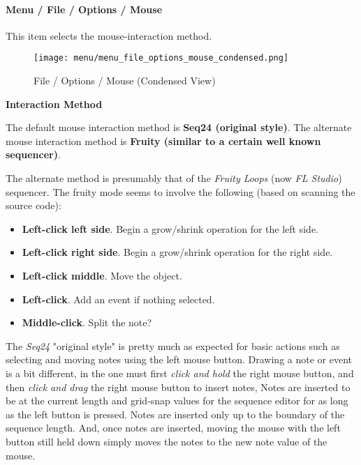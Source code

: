 \paragraph{Menu / File / Options / Mouse }
\label{paragraph:seq64_menu_file_options_mouse}

   This item selects the mouse-interaction method.

\begin{figure}[H]
   \centering 
   \texttt{[image: menu/menu\_file\_options\_mouse\_condensed.png]}
   \caption{File / Options / Mouse (Condensed View)}
   \label{fig:seq64_menu_file_options_mouse}
\end{figure}

   \textbf{Interaction Method}

   The default mouse interaction method is \textbf{Seq24 (original style)}.
   The alternate mouse interaction method is \textbf{Fruity (similar to a
   certain well known sequencer)}.

   The alternate method is presumably that of the \textsl{Fruity Loops}
   (now \textsl{FL Studio}) sequencer.  The fruity mode seems to involve the
   following (based on scanning the source code):

   \begin{itemize}
      \item \textbf{Left-click left side}.
         Begin a grow/shrink operation for the left side.
      \item \textbf{Left-click right side}.
         Begin a grow/shrink operation for the right side.
      \item \textbf{Left-click middle}.
         Move the object.
      \item \textbf{Left-click}.
         Add an event if nothing selected.
      \item \textbf{Middle-click}.
         Split the note?
   \end{itemize}

   The \textsl{Seq24} "original style" is pretty much as expected for basic
   actions such as selecting and moving notes using the left mouse button.
   Drawing a note or event is a bit different, in the one must first
   \textsl{click and hold} the right mouse button, and then
   \textsl{click and drag} the right mouse button to insert notes,
   Notes are inserted to be at the current length and grid-snap values for
   the sequence editor for as long as the left button is pressed.
   Notes are inserted only up to the boundary of the sequence length.
   And, once notes are inserted, moving the mouse with the left button still
   held down simply moves the notes to the new note value of the mouse.

